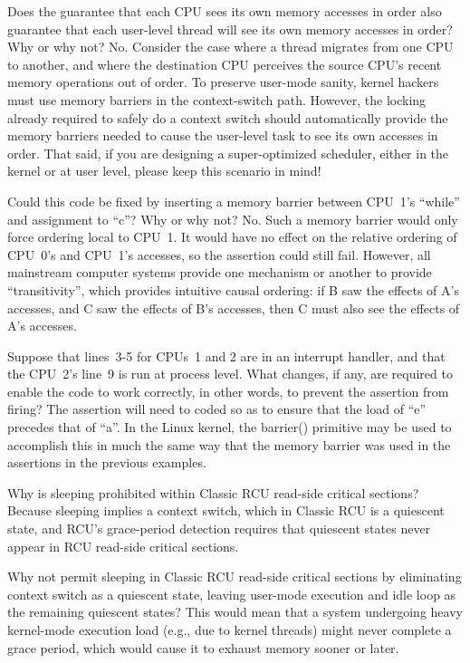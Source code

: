 \QuickQ{}
	Does the guarantee that each CPU sees its own memory accesses
	in order also guarantee that each user-level thread will see
	its own memory accesses in order?
	Why or why not?
\QuickA{}
	No.  Consider the case where a thread migrates from one CPU to
	another, and where the destination CPU perceives the source
	CPU's recent memory operations out of order.  To preserve
	user-mode sanity, kernel hackers must use memory barriers in
	the context-switch path.  However, the locking already required
	to safely do a context switch should automatically provide
	the memory barriers needed to cause the user-level task to see
	its own accesses in order.  That said, if you are designing a
	super-optimized scheduler, either in the kernel or at user level,
	please keep this scenario in mind!

\QuickQ{}
	Could this code be fixed by inserting a memory barrier
	between CPU~1's ``while'' and assignment to ``c''?
	Why or why not?
\QuickA{}
	No.  Such a memory barrier would only force ordering local to CPU~1.
	It would have no effect on the relative ordering of CPU~0's and
	CPU~1's accesses, so the assertion could still fail.
	However, all mainstream computer systems provide one mechanism
	or another to provide ``transitivity'', which provides
	intuitive causal ordering: if B saw the effects of A's accesses,
	and C saw the effects of B's accesses, then C must also see
	the effects of A's accesses.

\QuickQ{}
	Suppose that lines~3-5 for CPUs~1 and 2 are in an interrupt
	handler, and that the CPU~2's line~9 is run at process level.
	What changes, if any, are required to enable the code to work
	correctly, in other words, to prevent the assertion from firing?
\QuickA{}
	The assertion will need to coded so as to ensure that the load of
	``e'' precedes that of ``a''.
	In the Linux kernel, the barrier() primitive may be used to accomplish
	this in much the same way that the memory barrier was used in the
	assertions in the previous examples.

\QuickQ{}
	Why is sleeping prohibited within Classic RCU read-side
	critical sections?
\QuickA{}
	Because sleeping implies a context switch, which in Classic RCU is
	a quiescent state, and RCU's grace-period detection requires that
	quiescent states never appear in RCU read-side critical sections.

\QuickQ{}
	Why not permit sleeping in Classic RCU read-side critical sections
	by eliminating context switch as a quiescent state, leaving user-mode
	execution and idle loop as the remaining quiescent states?
\QuickA{}
	This would mean that a system undergoing heavy kernel-mode
	execution load (e.g., due to kernel threads) might never
	complete a grace period, which
	would cause it to exhaust memory sooner or later.

